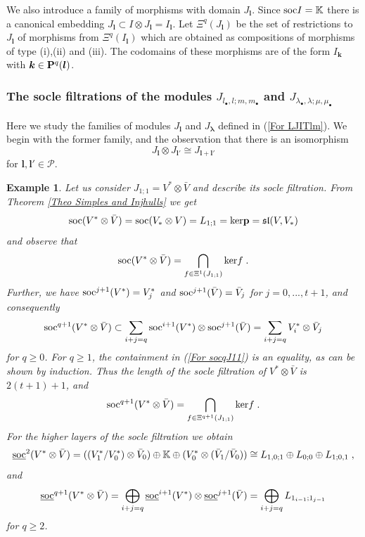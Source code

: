 \documentclass[12pt]{article}
\def\KK {{\mathbb K}}     %
\def\mc {\mathcal}
\def\mk {\mathfrak}
\def\ul  {\underline}
\newtheorem{example}{Example}[section]
\begin{document}
We also introduce a family of morphisms with domain $J_{\bm l}$. Since ${\rm soc}I=\KK$ there is a canonical embedding $J_{\bm l}\subset I\otimes J_{\bm l}= I_{\bm l}$. Let $\Xi^q(J_{\bm l})$ be the set of restrictions to $J_{\bm l}$ of morphisms from $\Xi^q(I_{\bm l})$ which are obtained as compositions of morphisms of type (i),(ii) and (iii). The codomains of these morphisms are of the form $I_{\bm k}$ with $\bm k\in{\bf P}^q(\bm l)$.


\subsubsection{The socle filtrations of the modules $J_{l_\bullet,l;m,m_\bullet}$ and $J_{\lambda_\bullet,\lambda;\mu,\mu_\bullet}$}\label{Sec Jlm}

Here we study the families of modules $J_{\bm l}$ and $J_{\bm\lambda}$ defined in (\ref{For LJITlm}). We begin with the former family, and the observation that there is an isomorphism
$$
J_{\bm{l}}\otimes J_{\bm l'} \cong J_{\bm l+\bm l'}
$$
for $\bm l,\bm l'\in\mc P$.

\begin{example}\label{Exa socJ11}
Let us consider $J_{1;1}=V^*\otimes \bar V$ and describe its socle filtration. From Theorem \ref{Theo Simples and Injhulls} we get
$$
{\rm soc}(V^*\otimes \bar V)= {\rm soc}(V_*\otimes V) = L_{1;1} ={\rm ker}{\bf p}= \mk{sl}(V,V_*)
$$
and observe that
$$
{\rm soc}(V^*\otimes \bar V) = \bigcap\limits_{f\in\Xi^1(J_{1;1})} {\rm ker}f \;.
$$
Further, we have ${\rm soc}^{j+1}(V^*)=V^*_j$ and ${\rm soc}^{j+1}(\bar V)=\bar V_j$ for $j=0,...,t+1$, and consequently
\begin{gather}\label{For socqJ11}
{\rm soc}^{q+1}(V^*\otimes \bar V)\subset \sum\limits_{i+j=q} {\rm soc}^{i+1}(V^*) \otimes {\rm soc}^{j+1}(\bar V)= \sum\limits_{i+j=q} V^*_i\otimes\bar V_j
\end{gather}
for $q\geq 0$. For $q\geq 1$, the containment in (\ref{For socqJ11}) is an equality, as can be shown by induction. Thus the length of the socle filtration of $V^*\otimes \bar V$ is $2(t+1)+1$, and
$$
{\rm soc}^{q+1}(V^*\otimes \bar V) = \bigcap\limits_{f\in\Xi^{q+1}(J_{1;1})} {\rm ker}f \;.
$$
For the higher layers of the socle filtration we obtain
$$
\ul{\rm soc}^2(V^*\otimes \bar V)= ((V^*_1/V^*_0)\otimes \bar V_0) \oplus \KK \oplus (V^*_0\otimes (\bar V_1/\bar V_0)) \cong L_{1,0;1}\oplus L_{0;0}\oplus L_{1;0,1} \;,
$$
and
$$
\ul{\rm soc}^{q+1}(V^*\otimes\bar V)= \bigoplus\limits_{i+j=q} \ul{\rm soc}^{i+1}(V^*)\otimes \ul{\rm soc}^{j+1}(\bar V) = \bigoplus\limits_{i+j=q} L_{1_{i-1};1_{j-1}}
$$
for $q\geq 2$. 
\end{example}
\end{document}
